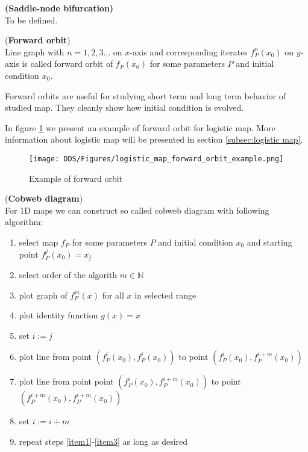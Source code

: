 \begin{definition} \textbf{(Saddle-node bifurcation)} \\
    \label{def:saddle_node_bif}
    To be defined.
\end{definition}

\begin{definition} (\textbf{Forward orbit}) \\
    Line graph with $n=1,2,3...$ on $x$-axis and corresponding iterates $f^{n}_P(x_0)$ on $y$-axis is called forward orbit of $f_{P}(x_0)$ for some parameters $P$ and initial condition $x_0$.
\end{definition}

\begin{remark}
    Forward orbits are useful for studying short term and long term behavior of studied map.
    They cleanly show how initial condition is evolved.
\end{remark}

\begin{example}
    In figure \ref{fig:forward_orbit_example} we present an example of forward orbit for logistic map. More information about logistic map will be presented in section \ref{subsec:logistic map}.
    \begin{figure}[!h]
        \centering
        \texttt{[image: DDS/Figures/logistic\_map\_forward\_orbit\_example.png]}
        \caption{Example of forward orbit}
        \label{fig:forward_orbit_example}
    \end{figure}
\end{example}

\begin{definition} (\textbf{Cobweb diagram}) \\
    \label{def:cobweb}
    For 1D maps we can construct so called cobweb diagram with following algorithm:
    \begin{enumerate}
        \item select map $f_P$ for some parameters $P$ and initial condition $x_0$ and starting point $f^{j}_P(x_0) = x_j$
        \item select order of the algorith $m \in \mathbb{N}$
        \item plot graph of $f^{m}_P(x)$ for all $x$ in selected range
        \item plot identity function $g(x) = x$
        \item set $i:=j$

        \item plot line from point $(f^{i}_P(x_0), f^{i}_P(x_0))$ to point $(f^{i}_P(x_0), f^{i+m}_P(x_0))$ \label{item1}
        \item plot line from point point $(f^{i}_P(x_0), f^{i+m}_P(x_0))$ to point $(f^{i+m}_P(x_0), f^{i+m}_P(x_0))$ \label{item2}
        \item set $i:=i+m$ \label{item3}

        \item repeat steps \ref{item1}-\ref{item3} as long as desired
    \end{enumerate}

\end{definition}

